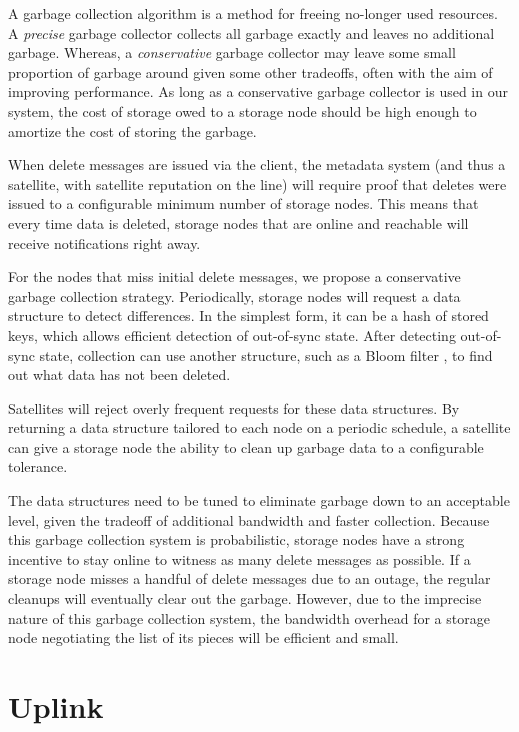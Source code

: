 \documentclass[11pt,fleqn,openany]{book}
\begin{document}
A garbage collection algorithm is a method for freeing no-longer used resources.
A {\em precise} garbage collector collects all garbage exactly and
leaves no additional garbage. Whereas, a {\em conservative} garbage collector may
leave some small proportion of garbage around given some other tradeoffs,
often with the aim of improving performance.
As long as a conservative garbage collector is used in our system, the cost of
storage owed to a storage node should be high enough to amortize the cost of
storing the garbage.

When delete messages are issued via the client, the metadata system (and thus a
satellite, with satellite reputation on the line) will require proof that
deletes were issued to a configurable minimum number of storage nodes.
This means that every time
data is deleted, storage nodes that are online and reachable will receive
notifications right away.

For the nodes that miss initial delete messages, we propose a conservative
garbage collection strategy. Periodically, storage nodes will request
a data structure to detect differences. In the simplest form, it can be a hash
of stored keys, which allows efficient detection of out-of-sync state. After
detecting out-of-sync state, collection can use another structure, such as a
Bloom filter \cite{bloom-filter}, to find out what data has not been
deleted.

Satellites will reject overly frequent requests for these data structures.
By returning a data
structure tailored to each node on a periodic schedule, a satellite can give a
storage node the ability to clean up garbage data to a configurable tolerance.

The data structures need to be tuned to eliminate garbage down to an acceptable
level, given the tradeoff of additional bandwidth and faster collection.
Because this garbage collection system is probabilistic, storage nodes have a
strong incentive to stay online to witness as many delete messages as possible.
If a storage node misses a handful of delete messages due to an outage, the
regular cleanups will eventually clear out the garbage.
However, due to the imprecise nature of this garbage collection
system, the
bandwidth overhead for a storage node negotiating the list of its pieces
will be efficient and small.

\section{Uplink}
\end{document}
